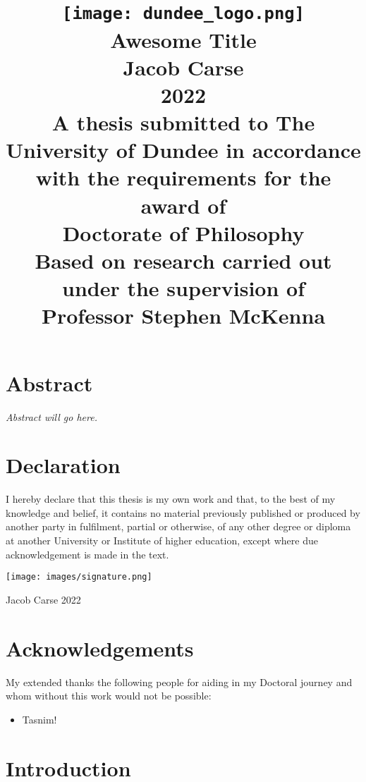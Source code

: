 \documentclass[12pt]{report}
\title{
	{\texttt{[image: dundee\_logo.png]}}\\
	\vspace{15mm}
	{Awesome Title}\\
	\vspace{5mm}
	{\Large Jacob Carse}\\
	{\Large 2022}\\
	\vspace{5mm}
	{\normalsize A thesis submitted to The University of Dundee in accordance with the requirements for the award of}\\
	{\large Doctorate of Philosophy}\\
	\vspace{5mm}
	{\normalsize Based on research carried out under the supervision of}\\
	{\large Professor Stephen McKenna}
}
\date{\vspace{-5ex}}
\author{}
\begin{document}
	
	
	\maketitle
	
	\chapter*{Abstract}
	\textit{Abstract will go here.}
	
	\chapter*{Declaration}
	I hereby declare that this thesis is my own work and that, to the best of my knowledge and belief, it contains no material previously published or produced by another party in fulfilment, partial or otherwise, of any other degree or diploma at another University or Institute of higher education, except where due acknowledgement is made in the text.
	
	\vspace{30pt}
	\begin{flushright}
		\begin{figure*}[h]
			\begin{flushright}
				\texttt{[image: images/signature.png]}
			\end{flushright}
		\end{figure*}
	
		Jacob Carse
		2022
	
	\end{flushright}

	\chapter*{Acknowledgements}
	My extended thanks the following people for aiding in my Doctoral journey and whom without this work would not be possible:
	
	\begin{itemize}
		\item Tasnim!
	\end{itemize}

	\tableofcontents
	\listoffigures
	\listoftables
	
	
	\chapter{Introduction}
	\label{ch:introduction}
	
	
\end{document}
